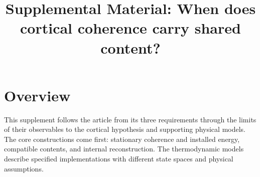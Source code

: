 \documentclass{article}
\title{Supplemental Material: When does cortical coherence carry shared content?}
\author{}
\date{}
\begin{document}
\maketitle

\section*{Overview}
\renewcommand{\thefigure}{S\arabic{figure}}
\setcounter{figure}{0}
\renewcommand{\thesuppresult}{S\arabic{suppresult}}
This supplement follows the article from its three requirements through the limits of their observables to the cortical hypothesis and supporting physical models. The core constructions come first: stationary coherence and installed energy, compatible contents, and internal reconstruction. The thermodynamic models describe specified implementations with different state spaces and physical assumptions.
\end{document}
